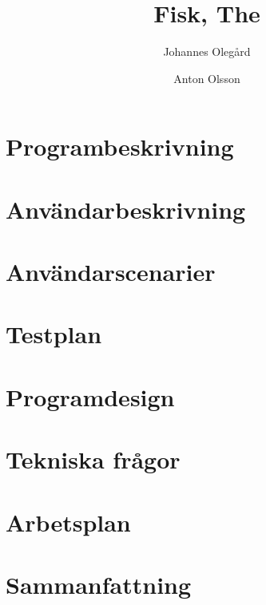 \documentclass[a4paper, 11pt]{article}
\title{Fisk, The} %
\author{Johannes Olegård \and Anton Olsson}
\begin{document}
\maketitle

\section{Programbeskrivning}
\label{sec:progb}


\vspace{12pt}

\vspace{12pt}


\section{Användarbeskrivning}
\label{sec:anvb}


\vspace{12pt}

\vspace{12pt}


\section{Användarscenarier}
\label{sec:anvsc}


\vspace{12pt}

\vspace{12pt}


\section{Testplan}
\label{sec:testplan}


\vspace{12pt}

\vspace{12pt}


\section{Programdesign}
\label{sec:design}

\vspace{12pt}

\vspace{12pt}


\section{Tekniska frågor}
\label{sec:qa}

\vspace{12pt}

\vspace{12pt}


\section{Arbetsplan}
\label{sec:arbplan}

\vspace{12pt}

\vspace{12pt}


\section{Sammanfattning}
\end{document}
